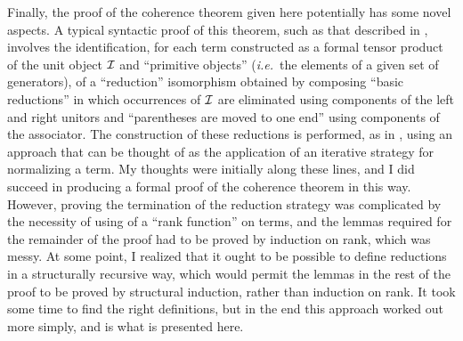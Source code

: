 \documentclass[11pt,notitlepage,a4paper]{report}
\begin{document}
Finally, the proof of the coherence theorem given here potentially has some
novel aspects.  A typical syntactic proof of this theorem, such as that described
in \cite{MacLane71}, involves the identification, for each term constructed
as a formal tensor product of the unit object ${\cal I}$ and ``primitive objects''
({\em i.e.}~the elements of a given set of generators), of a ``reduction''
isomorphism obtained by composing ``basic reductions'' in which occurrences
of ${\cal I}$ are eliminated using components of the left and right unitors and
``parentheses are moved to one end'' using components of the associator.
The construction of these reductions is performed, as in \cite{MacLane71},
using an approach that can be thought of as the application of an iterative
strategy for normalizing a term.
My thoughts were initially along these lines, and I did succeed in producing
a formal proof of the coherence theorem in this way.  However, proving the
termination of the reduction strategy was complicated by the necessity of using
of a ``rank function'' on terms, and the lemmas required for the remainder of the
proof had to be proved by induction on rank, which was messy.
At some point, I realized that it ought to be possible to define reductions
in a structurally recursive way, which would permit the lemmas in the rest of
the proof to be proved by structural induction, rather than induction on rank.
It took some time to find the right definitions, but in the end this
approach worked out more simply, and is what is presented here.





\end{document}
